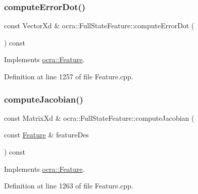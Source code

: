 \subsubsection{\texorpdfstring{compute\+Error\+Dot()}{computeErrorDot()}\hspace{0.1cm}{\footnotesize\ttfamily [2/2]}}
{\footnotesize\ttfamily const Vector\+Xd \& ocra\+::\+Full\+State\+Feature\+::compute\+Error\+Dot (\begin{DoxyParamCaption}{ }\end{DoxyParamCaption}) const\hspace{0.3cm}{\ttfamily [virtual]}}



Implements \hyperlink{classocra_1_1Feature_a01a4870418ba87d5b41d8f917c1255fc}{ocra\+::\+Feature}.



Definition at line 1257 of file Feature.\+cpp.

\hypertarget{classocra_1_1FullStateFeature_abcd0254d7836bea5531d49afff872d20}{}\label{classocra_1_1FullStateFeature_abcd0254d7836bea5531d49afff872d20} 
\subsubsection{\texorpdfstring{compute\+Jacobian()}{computeJacobian()}\hspace{0.1cm}{\footnotesize\ttfamily [1/2]}}
{\footnotesize\ttfamily const Matrix\+Xd \& ocra\+::\+Full\+State\+Feature\+::compute\+Jacobian (\begin{DoxyParamCaption}\item[{const \hyperlink{classocra_1_1Feature}{Feature} \&}]{feature\+Des }\end{DoxyParamCaption}) const\hspace{0.3cm}{\ttfamily [virtual]}}



Implements \hyperlink{classocra_1_1Feature_a4fb8eeeed978a1f727ec43cd1bd18d78}{ocra\+::\+Feature}.



Definition at line 1263 of file Feature.\+cpp.

\hypertarget{classocra_1_1FullStateFeature_a9f1b50d69d0a5220286e9a7c3fb54835}{}\label{classocra_1_1FullStateFeature_a9f1b50d69d0a5220286e9a7c3fb54835} 
